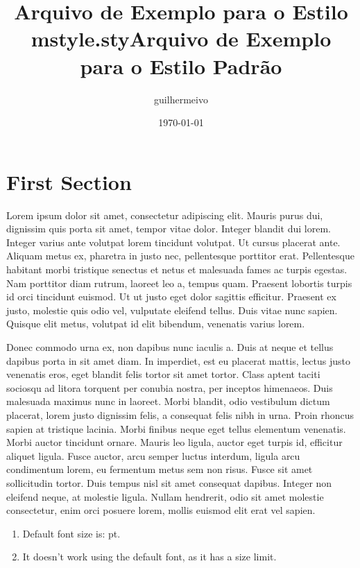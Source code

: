 \documentclass[12pt]{article}
\title{Arquivo de Exemplo para o Estilo mstyle.sty}
\title{Arquivo de Exemplo para o Estilo Padrão}
\author{guilhermeivo}
\date{\today}
\begin{document}
\maketitle
\cleardoublepage


\section{First Section}

Lorem ipsum dolor sit amet, consectetur adipiscing elit. Mauris purus dui, dignissim quis porta sit amet, tempor vitae dolor. Integer blandit dui lorem. Integer varius ante volutpat lorem tincidunt volutpat. Ut cursus placerat ante. Aliquam metus ex, pharetra in justo nec, pellentesque porttitor erat. Pellentesque habitant morbi tristique senectus et netus et malesuada fames ac turpis egestas. Nam porttitor diam rutrum, laoreet leo a, tempus quam. Praesent lobortis turpis id orci tincidunt euismod. Ut ut justo eget dolor sagittis efficitur. Praesent ex justo, molestie quis odio vel, vulputate eleifend tellus. Duis vitae nunc sapien. Quisque elit metus, volutpat id elit bibendum, venenatis varius lorem.

Donec commodo urna ex, non dapibus nunc iaculis a. Duis at neque et tellus dapibus porta in sit amet diam. In imperdiet, est eu placerat mattis, lectus justo venenatis eros, eget blandit felis tortor sit amet tortor. Class aptent taciti sociosqu ad litora torquent per conubia nostra, per inceptos himenaeos. Duis malesuada maximus nunc in laoreet. Morbi blandit, odio vestibulum dictum placerat, lorem justo dignissim felis, a consequat felis nibh in urna. Proin rhoncus sapien at tristique lacinia. Morbi finibus neque eget tellus elementum venenatis. Morbi auctor tincidunt ornare. Mauris leo ligula, auctor eget turpis id, efficitur aliquet ligula. Fusce auctor, arcu semper luctus interdum, ligula arcu condimentum lorem, eu fermentum metus sem non risus. Fusce sit amet sollicitudin tortor. Duis tempus nisl sit amet consequat dapibus. Integer non eleifend neque, at molestie ligula. Nullam hendrerit, odio sit amet molestie consectetur, enim orci posuere lorem, mollis euismod elit erat vel sapien.

\begin{enumerate}
    \item Default font size is: \makeatletter\f@size\makeatother pt.
    
    \item It doesn't work using the default font, as it has a size limit.
\end{enumerate}    
\end{document}
